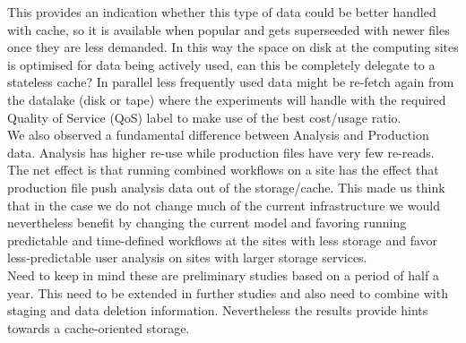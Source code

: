 This provides an indication whether this type of data could be better handled with cache, so it is available when popular and gets superseeded with newer files once they are less demanded. In this way the space on disk at the computing sites is optimised for data being actively used, can this be completely delegate to a stateless cache? In parallel less frequently used data might be re-fetch again from the datalake (disk or tape) where the experiments will handle with the required Quality of Service (QoS) label to make use of the best cost/usage ratio.\\
We also observed a fundamental difference between Analysis and Production data. Analysis has higher re-use while production files have very few re-reads. The net effect is that running combined workflows on a site has the effect that production file push analysis data out of the storage/cache. This made us think that in the case we do not change much of the current infrastructure we would nevertheless benefit by changing the current model and favoring running predictable and time-defined workflows at the sites with less storage and favor less-predictable user analysis on sites with larger storage services.\\
Need to keep in mind these are preliminary studies based on a period of half a year. This need to be extended in further studies and also need to combine with staging and data deletion information. Nevertheless the results provide hints towards a cache-oriented storage.
